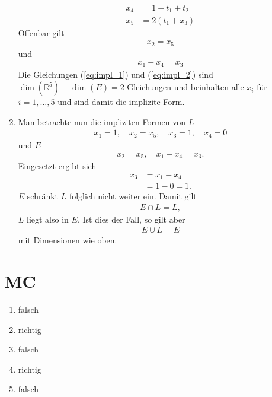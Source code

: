 \documentclass[11pt]{article}
\begin{document}
\begin{enumerate}[1)]
\begin{equation*}
\begin{aligned}
	x_4 &= 1 - t_1 + t_2\\
	x_5 &= 2(t_1 + x_3)
	\end{aligned}
	\end{equation*}
	Offenbar gilt
	\begin{equation}
	\begin{aligned}
	x_2 = x_5 \label{eq:impl_1}
	\end{aligned}
	\end{equation}
	und
	\begin{equation}
	\begin{aligned}
	x_1 - x_4 = x_3 \label{eq:impl_2}
	\end{aligned}
	\end{equation}
	Die Gleichungen (\ref{eq:impl_1}) und (\ref{eq:impl_2}) sind $ \dim(\mathbb{R}^5) - \dim(E) = 2 $ Gleichungen und beinhalten alle $ x_i $ für $ i=1,\dots,5 $ und sind damit die implizite Form.
	\item Man betrachte nun die impliziten Formen von $ L $
	\begin{equation*}
	\begin{aligned}
	x_1 = 1, \quad x_2 = x_5, \quad x_3 = 1, \quad x_4 = 0
	\end{aligned}
	\end{equation*}
	und $ E $
	\begin{equation*}
	\begin{aligned}
	x_2 = x_5, \quad x_1 - x_4 = x_3.
	\end{aligned}
	\end{equation*}
	Eingesetzt ergibt sich
	\begin{equation*}
	\begin{aligned}
	x_3 &= x_1 - x_4\\
	&= 1 - 0 = 1.
	\end{aligned}
	\end{equation*}
	$ E $ schränkt $ L $ folglich nicht weiter ein. Damit gilt
	\begin{equation*}
	\begin{aligned}
	E \cap L = L,
	\end{aligned}
	\end{equation*}
	$ L $ liegt also in $ E $. Ist dies der Fall, so gilt aber
	\begin{equation*}
	\begin{aligned}
	E \cup L = E
	\end{aligned}
	\end{equation*}
	mit Dimensionen wie oben.
\end{enumerate}


\section*{MC}
\begin{enumerate}
	\item falsch
	\item richtig
	\item falsch
	\item richtig
	\item falsch
\end{enumerate}
\end{document}

